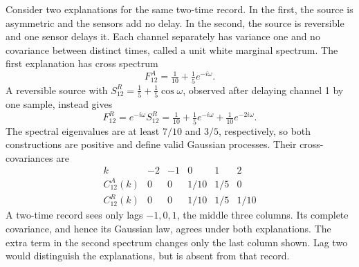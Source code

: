 Consider two explanations for the same two-time record. In the first, the source is asymmetric and the sensors add no delay. In the second, the source is reversible and one sensor delays it. Each channel separately has variance one and no covariance between distinct times, called a unit white marginal spectrum. The first explanation has cross spectrum
\[
 F^A_{12}=\tfrac1{10}+\tfrac15e^{-i\omega}.
\]
A reversible source with $S^R_{12}=\tfrac15+\tfrac15\cos\omega$, observed after delaying channel 1 by one sample, instead gives
\[
 F^R_{12}=e^{-i\omega}S^R_{12}
 =\tfrac1{10}+\tfrac15e^{-i\omega}+\tfrac1{10}e^{-2i\omega}.
\]
The spectral eigenvalues are at least $7/10$ and $3/5$, respectively, so both constructions are positive and define valid Gaussian processes. Their cross-covariances are
\[
\begin{array}{c|ccccc}
 k&-2&-1&0&1&2\\\hline
 C^A_{12}(k)&0&0&1/10&1/5&0\\
 C^R_{12}(k)&0&0&1/10&1/5&1/10
\end{array}
\]
A two-time record sees only lags $-1,0,1$, the middle three columns. Its complete covariance, and hence its Gaussian law, agrees under both explanations. The extra term in the second spectrum changes only the last column shown. Lag two would distinguish the explanations, but is absent from that record.
